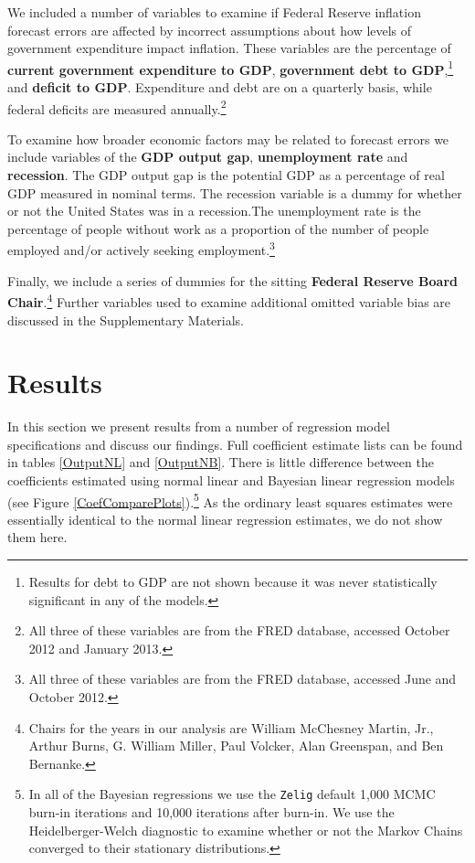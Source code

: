 \documentclass[a4paper]{article}
\begin{document}
We included a number of variables to examine if Federal Reserve inflation forecast errors are affected by incorrect assumptions about how levels of government expenditure impact inflation. These variables are the percentage of {\bf{current government expenditure to GDP}}, {\bf{government debt to GDP}},\footnote{Results for debt to GDP are not shown because it was never statistically significant in any of the models.} and \textbf{deficit to GDP}. Expenditure and debt are on a quarterly basis, while federal deficits are measured annually.\footnote{All three of these variables are from the FRED database, accessed October 2012 and January 2013.}

To examine how broader economic factors may be related to forecast errors we include variables of the {\bf{GDP output gap}}, {\bf{unemployment rate}} and {\bf{recession}}. The GDP output gap is the potential GDP as a percentage of real GDP measured in nominal terms. The recession variable is a dummy for whether or not the United States was in a recession.The unemployment rate is the percentage of people without work as a proportion of the number of people employed and/or actively seeking employment.\footnote{All three of these variables are from the FRED database, accessed June and October 2012.}

Finally, we include a series of dummies for the sitting {\bf{Federal Reserve Board Chair}}.\footnote{Chairs for the years in our analysis are William McChesney Martin, Jr., Arthur Burns, G. William Miller, Paul Volcker, Alan Greenspan, and Ben Bernanke.} Further variables used to examine additional omitted variable bias are discussed in the Supplementary Materials.

\section{Results}

In this section we present results from a number of regression model specifications and discuss our findings. Full coefficient estimate lists can be found in tables \ref{OutputNL} and \ref{OutputNB}. There is little difference between the coefficients estimated using normal linear and Bayesian linear regression models (see Figure \ref{CoefComparePlots}).\footnote{In all of the Bayesian regressions we use the {\tt{Zelig}} default 1,000 MCMC burn-in iterations and 10,000 iterations after burn-in. We use the Heidelberger-Welch diagnostic to examine whether or not the Markov Chains converged to their stationary distributions.} As the ordinary least squares estimates were essentially identical to the normal linear regression estimates, we do not show them here.
\end{document}

